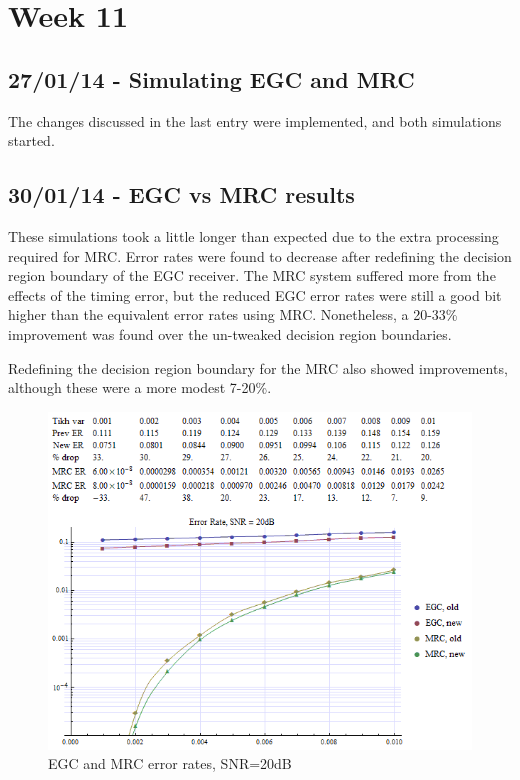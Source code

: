 \section{Week 11}

\subsection{27/01/14 - Simulating EGC and MRC}

The changes discussed in the last entry were implemented, and both
simulations started.

\subsection{30/01/14 - EGC vs MRC results}

These simulations took a little longer than expected due to the extra
processing required for MRC. Error rates were found to decrease after
redefining the decision region boundary of the EGC receiver. The MRC
system suffered more from the effects of the timing error, but the
reduced EGC error rates were still a good bit higher than the equivalent
error rates using MRC. Nonetheless, a 20-33\% improvement was found over
the un-tweaked decision region boundaries.

Redefining the decision region boundary for the MRC also showed
improvements, although these were a more modest 7-20\%.

\begin{figure}[htbp]
\centering
\includegraphics{../plots/egc_mrc_20db.png}
\caption{EGC and MRC error rates, SNR=20dB}
\end{figure}

